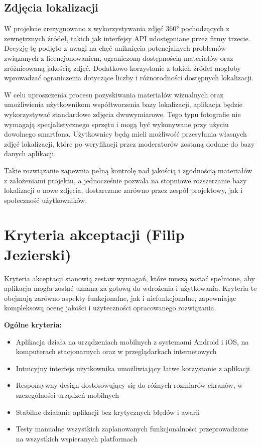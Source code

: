 \subsection{Zdjęcia lokalizacji}
W projekcie zrezygnowano z wykorzystywania zdjęć 360° pochodzących z zewnętrznych źródeł, takich jak interfejsy API udostępniane przez firmy trzecie. Decyzję tę podjęto z uwagi na chęć uniknięcia potencjalnych problemów związanych z licencjonowaniem, ograniczoną dostępnością materiałów oraz zróżnicowaną jakością zdjęć. Dodatkowo korzystanie z takich źródeł mogłoby wprowadzać ograniczenia dotyczące liczby i różnorodności dostępnych lokalizacji.

W celu uproszczenia procesu pozyskiwania materiałów wizualnych oraz umożliwienia użytkownikom współtworzenia bazy lokalizacji, aplikacja będzie wykorzystywać standardowe zdjęcia dwuwymiarowe. Tego typu fotografie nie wymagają specjalistycznego sprzętu i mogą być wykonywane przy użyciu dowolnego smartfona. Użytkownicy będą mieli możliwość przesyłania własnych zdjęć lokalizacji, które po weryfikacji przez moderatorów zostaną dodane do bazy danych aplikacji.

Takie rozwiązanie zapewnia pełną kontrolę nad jakością i zgodnością materiałów z założeniami projektu, a jednocześnie pozwala na stopniowe rozszerzanie bazy lokalizacji o nowe zdjęcia, dostarczane zarówno przez zespół projektowy, jak i społeczność użytkowników.

\section{Kryteria akceptacji (Filip Jezierski)}
Kryteria akceptacji stanowią zestaw wymagań, które muszą zostać spełnione, aby aplikacja mogła zostać uznana za gotową do wdrożenia i użytkowania. Kryteria te obejmują zarówno aspekty funkcjonalne, jak i niefunkcjonalne, zapewniając kompleksową ocenę jakości i użyteczności opracowanego rozwiązania.

\bigskip
\noindent
\textbf{Ogólne kryteria:}
\begin{itemize}
    \item Aplikacja działa na urządzeniach mobilnych z systemami Android i iOS, na komputerach stacjonarnych oraz w przeglądarkach internetowych
    \item Intuicyjny interfejs użytkownika umożliwiający łatwe korzystanie z aplikacji
    \item Responsywny design dostosowujący się do różnych rozmiarów ekranów, w szczególności urządzeń mobilnych
    \item Stabilne działanie aplikacji bez krytycznych błędów i awarii
    \item Testy manualne wszystkich zaplanowanych funkcjonalności przeprowadzone na wszystkich wspieranych platformach
\end{itemize}

